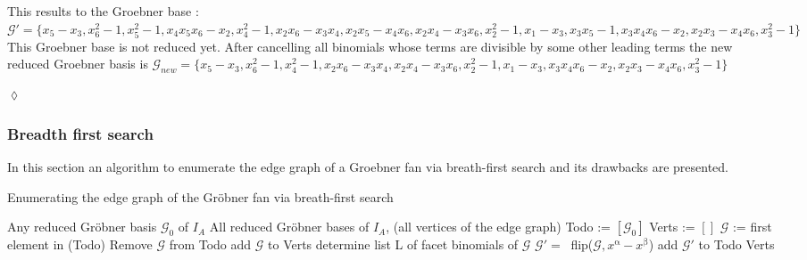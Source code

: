 \begin{env_example}
This results to the Groebner base : \\
$\mathcal{G}' = \{x_{5}-x_{3}, x_{6}^{2}-1, x_{5}^{2}-1, x_{4}x_{5}x_{6}-x_{2}, x_{4}^{2}-1, x_{2}x_{6}-x_{3}x_{4},
x_{2}x_{5}-x_{4}x_{6}, x_{2}x_{4}-x_{3}x_{6} ,x_{2}^{2}-1,x_{1}-x_{3},x_{3}x_{5}-1,x_{3}x_{4}x_{6}-x_{2},x_{2}x_{3}-x_{4}x_{6},x_{3}^{2}-1   \}$ \\

This Groebner base is not reduced yet. After cancelling all binomials whose terms are divisible by some other leading terms the new reduced Groebner basis is 
$\mathcal{G}_{new} = \{x_{5}-x_{3},x_{6}^{2}-1,x_{4}^{2}-1,x_{2}x_{6}-x_{3}x_{4},x_{2}x_{4}-x_{3}x_{6},x_{2}^{2}-1,x_{1}-x_{3}, x_{3}x_{4}x_{6}-x_{2},x_{2}x_{3}-x_{4}x_{6},x_{3}^{2}-1 \} $

\begin{flushright}
$\lozenge$
\end{flushright}
\end{env_example}


\subsubsection{Breadth first search}

In this section an algorithm to enumerate the edge graph of a Groebner fan via breath-first search and its drawbacks are presented.

\begin{algorithm}
\caption{Enumerating the edge graph of the Gröbner fan via breath-first search \cite{tigers}}
\label{alg:breath}
\begin{algorithmic}[1]

\Require
Any reduced Gröbner basis $ \mathcal{G}_0 $ of $I_A$
\Ensure All reduced Gröbner bases of $I_A$, (all vertices of the edge graph)
\State Todo := $\left[ \mathcal{G}_0 \right]  $
\State Verts := $\left[ \right] $
\State $\mathcal{G}$ := first element in (Todo)
\State Remove $\mathcal{G} $ from Todo
\State add $\mathcal{G}$ to Verts 
\State determine list L of facet binomials of $\mathcal{G} $
 \State $\mathcal{G}' =~$ flip($\mathcal{G},x^{\upalpha} - x^{\upbeta} $)
 \State add $\mathcal{G}'$ to Todo
 \EndIf
 \EndFor
\EndWhile 
\Return Verts

\end{algorithmic}
\end{algorithm}

